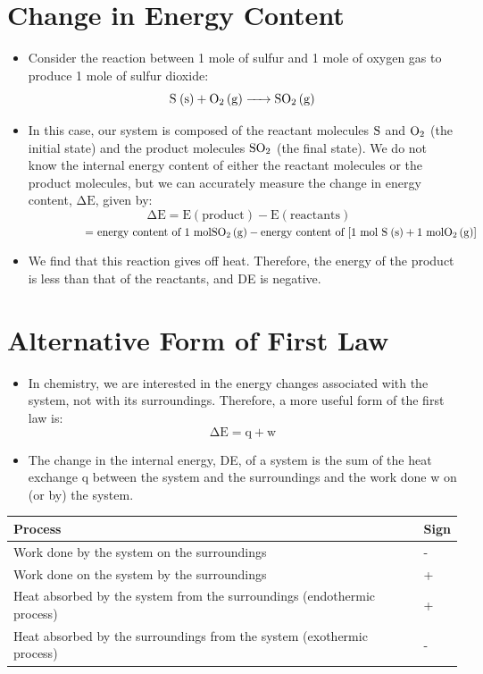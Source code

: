 \documentclass[a4paper,12pt,twocolumn]{article}
\begin{document}
\section{Change in Energy Content}
\begin{itemize}
\item Consider the reaction between 1 mole of sulfur and 1 mole of oxygen gas to produce 1 mole of sulfur dioxide:
$$\ce{S (s) + O2 (g) -> SO2 (g)}$$ 
\item In this case, our system is composed of the reactant molecules $\ce{S}$ and $\ce{O2}$ (the initial state) and the product molecules $\ce{SO2}$ (the final state). 
We do not know the internal energy content of either the reactant molecules or the product molecules, but we can accurately measure the change in energy content, $\mathrm{\Delta E}$, given by:
$$\quad \mathrm{\Delta E = E(product) - E(reactants)}$$
$\quad \quad \quad \qquad \text{= energy content of 1 mol} \ce{SO2 (g)} - \text{energy content of [1 mol } \ce{S (s)} + \text {1 mol} \ce{O2 (g)} ]$
\item We find that this reaction gives off heat. Therefore, the energy of the product is less than that of the reactants, and DE is negative.
\end{itemize}

\section{Alternative Form of First Law}
\begin{itemize}
\item In chemistry, we are interested in the energy changes associated with the system, not with its surroundings. Therefore, a more useful form of the first law is:
$$\mathrm{\Delta E = q + w}$$
\item The change in the internal energy, DE, of a system is the sum of the heat exchange q between the system and the surroundings and the work done w on (or by) the system. 
\end{itemize}


\begin{table}[h]
\centering
\def\arraystretch{1.5}
\begin{tabular}{|p{2.5in}|l|}
\hline
Process & Sign \\ \hline 
Work done by the system on the surroundings & -\\ \hline 
Work done on the system by the surroundings & +\\ \hline 
Heat absorbed by the system from the surroundings (endothermic process) & +\\ \hline 
Heat absorbed by the surroundings from the system (exothermic process) & - \\ \hline
\end{tabular}
\end{table}
\end{document}
